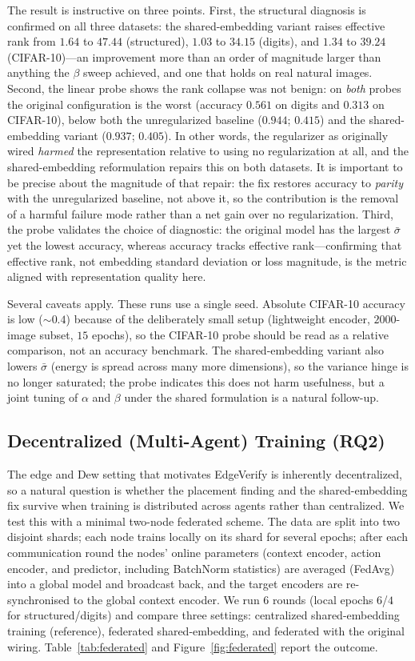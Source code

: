 The result is instructive on three points. First, the structural diagnosis is
confirmed on all three datasets: the shared-embedding variant raises effective
rank from $1.64$ to $47.44$ (structured), $1.03$ to $34.15$ (digits), and
$1.34$ to $39.24$ (CIFAR-10)---an improvement more than an order of magnitude
larger than anything the $\beta$ sweep achieved, and one that holds on real
natural images. Second, the linear probe shows the rank collapse was not
benign: on \emph{both} probes the original configuration is the worst
(accuracy $0.561$ on digits and $0.313$ on CIFAR-10), below both the
unregularized baseline ($0.944$; $0.415$) and the shared-embedding variant
($0.937$; $0.405$). In other words, the regularizer as originally wired
\emph{harmed} the representation relative to using no regularization at all,
and the shared-embedding reformulation repairs this on both datasets. It is
important to be precise about the magnitude of that repair: the fix restores
accuracy to \emph{parity} with the unregularized baseline, not above it, so
the contribution is the removal of a harmful failure mode rather than a net
gain over no regularization. Third, the probe validates the choice of
diagnostic: the original model has the largest $\bar\sigma$ yet the lowest
accuracy, whereas accuracy tracks effective rank---confirming that effective
rank, not embedding standard deviation or loss magnitude, is the metric
aligned with representation quality here.

Several caveats apply. These runs use a single seed. Absolute CIFAR-10
accuracy is low ($\sim 0.4$) because of the deliberately small setup
(lightweight encoder, $2000$-image subset, $15$ epochs), so the CIFAR-10 probe
should be read as a relative comparison, not an accuracy benchmark. The
shared-embedding variant also lowers $\bar\sigma$ (energy is spread across many
more dimensions), so the variance hinge is no longer saturated; the probe
indicates this does not harm usefulness, but a joint tuning of $\alpha$ and
$\beta$ under the shared formulation is a natural follow-up.

\subsection{Decentralized (Multi-Agent) Training (RQ2)}
\label{sec:federated}
The edge and Dew setting that motivates EdgeVerify is inherently
decentralized, so a natural question is whether the placement finding and the
shared-embedding fix survive when training is distributed across agents rather
than centralized. We test this with a minimal two-node federated scheme. The
data are split into two disjoint shards; each node trains locally on its shard
for several epochs; after each communication round the nodes' online
parameters (context encoder, action encoder, and predictor, including
BatchNorm statistics) are averaged (FedAvg) into a global model and broadcast
back, and the target encoders are re-synchronised to the global context
encoder. We run $6$ rounds (local epochs $6$/$4$ for structured/digits) and
compare three settings: centralized shared-embedding training (reference),
federated shared-embedding, and federated with the original wiring.
Table~\ref{tab:federated} and Figure~\ref{fig:federated} report the outcome.

